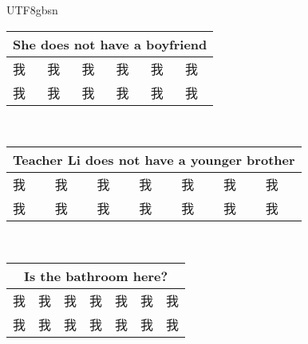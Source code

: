 \documentclass{article}
\newlength\mycolw
\newcommand{\myfont}{gbsn} %
\begin{document}
 
\begin{CJK}{UTF8}{\myfont} 

\Huge
\setlength{}
\addtolength\mycolw{-2\tabcolsep}
\begin{tabular}{|p{\mycolw}|p{\mycolw}|p{\mycolw}|p{\mycolw}|p{\mycolw}|p{\mycolw}|} \hline
\multicolumn{6}{|c|}{She does not have a boyfriend} \\ \hline
\color{white} 我 &\color{white} 我 &\color{white} 我 &\color{white} 我 &\color{white} 我 & \color{white} 我 \\ \hline
\color{white} 我 &\color{white} 我 &\color{white} 我 &\color{white} 我 &\color{white} 我 & \color{white} 我 \\ \hline
\end{tabular}
\\ \vspace{0.3 in}
\setlength{}
\addtolength\mycolw{-2\tabcolsep}
\begin{tabular}{|p{\mycolw}|p{\mycolw}|p{\mycolw}|p{\mycolw}|p{\mycolw}|p{\mycolw}|p{\mycolw}|} \hline
\multicolumn{7}{|c|}{Teacher Li does not have a younger brother} \\ \hline
\color{white} 我 &\color{white} 我 &\color{white} 我 &\color{white} 我 &\color{white} 我 &\color{white} 我 & \color{white} 我 \\ \hline
\color{white} 我 &\color{white} 我 &\color{white} 我 &\color{white} 我 &\color{white} 我 &\color{white} 我 & \color{white} 我 \\ \hline
\end{tabular}
\\ \vspace{0.3 in}
\setlength{}
\addtolength\mycolw{-2\tabcolsep}
\begin{tabular}{|p{\mycolw}|p{\mycolw}|p{\mycolw}|p{\mycolw}|p{\mycolw}|p{\mycolw}|p{\mycolw}|} \hline
\multicolumn{7}{|c|}{Is the bathroom here?} \\ \hline
\color{white} 我 &\color{white} 我 &\color{white} 我 &\color{white} 我 &\color{white} 我 &\color{white} 我 & \color{white} 我 \\ \hline
\color{white} 我 &\color{white} 我 &\color{white} 我 &\color{white} 我 &\color{white} 我 &\color{white} 我 & \color{white} 我 \\ \hline
\end{tabular}
\\ \vspace{0.3 in}
\setlength{}
\addtolength\mycolw{-2\tabcolsep}
\begin{tabular}{|p{\mycolw}|p{\mycolw}|p{\mycolw}|p{\mycolw}|p{\mycolw}|p{\mycolw}|p{\mycolw}|} \hline

\end{tabular}
\end{CJK}
\end{document}
